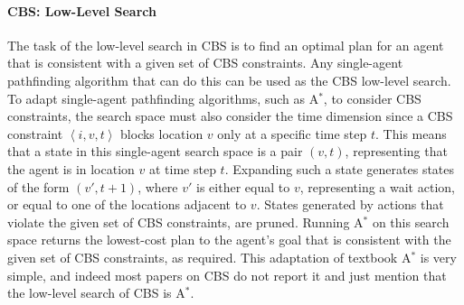 \documentclass[review]{elsarticle}
\newcommand{\tuple}[1]{\ensuremath{\left \langle #1 \right \rangle }}
\newcommand\roni[1]{\nb{\textbf{Roni:}}{green}{#1}}
\newcommand\dor[1]{\nb{\textbf{Dor:}}{Fuchsia}{#1}}
\newcommand{\cbs}{\ac{CBS}\xspace}
\newcommand{\astar}{A$^*$\xspace}
\begin{document}

\paragraph{\textbf{\cbs: Low-Level Search}}
The task of the low-level search in \cbs is to find an optimal plan for an agent 
that is consistent with a given set of \cbs constraints. 
Any single-agent pathfinding algorithm that can do this can be used as the \cbs low-level search. 
To adapt single-agent pathfinding algorithms, such as \astar{}, to consider \cbs constraints, 
the search space must also consider the time dimension since a \cbs constraint $\tuple{i,v,t}$ 
blocks location $v$ only at a specific time step $t$. 
This means that a state in this single-agent search space is a pair $(v,t)$, representing that the agent is in location $v$ at time step $t$. Expanding such a state generates states 
of the form $(v',t+1)$, where $v'$ is either equal to $v$, representing a wait action, 
or equal to one of the locations adjacent to $v$. States generated by actions that violate the given set of \cbs constraints, are pruned. Running \astar{} on this search space returns the lowest-cost plan to the agent's goal that is consistent with the given set of \cbs constraints, as required. This adaptation of textbook \astar{} is very simple, and indeed most papers on \cbs do not report it and just mention that the low-level search of \cbs is \astar{}. 
\end{document}
